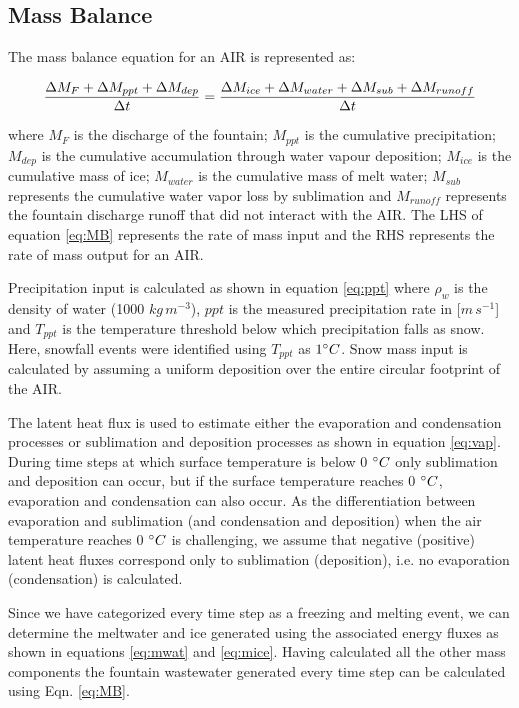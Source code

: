 \documentclass[utf8]{frontiersSCNS} %
\begin{document}
\subsection{Mass Balance}

The mass balance equation for an AIR is represented as:

\begin{equation}
	\frac{\Delta M_{F} + \Delta M_{ppt} + \Delta M_{dep}}{\Delta t} = \frac{\Delta M_{ice} +\Delta M_{water} +
		\Delta M_{sub} + \Delta M_{runoff}}{\Delta t}  \\
	\label{eq:MB}
\end{equation}

where $M_{F}$ is the discharge of the fountain; $M_{ppt}$ is the cumulative precipitation;  $M_{dep}$ is the cumulative
accumulation through water vapour deposition; $M_{ice}$ is the cumulative mass of ice; $M_{water}$ is the cumulative
mass of melt water; $M_{sub}$ represents the cumulative water vapor loss by sublimation and $M_{runoff}$ represents the
fountain discharge runoff that did not interact with the AIR. The LHS of equation \ref{eq:MB} represents the rate of
mass input and the RHS represents the rate of mass output for an AIR.

Precipitation input is calculated as shown in equation \ref{eq:ppt} where $\rho_{w}$ is the density of water (1000
$kg\,m^{-3}$), $ppt$ is the measured precipitation rate in [$m\,s^{-1}$] and $T_{ppt}$ is the temperature threshold
below which precipitation falls as snow. Here, snowfall events were identified using $T_{ppt}$ as $1 \degree C$. Snow
mass input is calculated by assuming a uniform deposition over the entire circular footprint of the AIR.

The latent heat flux is used to estimate either the evaporation and condensation processes or sublimation and deposition
processes as shown in equation \ref{eq:vap}. During time steps at which surface temperature is below 0 $\degree C$ only
sublimation and deposition can occur, but if the surface temperature reaches 0 $\degree C$, evaporation and condensation
can also occur. As the differentiation between evaporation and sublimation (and condensation and deposition) when the
air temperature reaches 0 $\degree C$ is challenging, we assume that negative (positive) latent heat fluxes correspond
only to sublimation (deposition), i.e. no evaporation (condensation) is calculated.

Since we have categorized every time step as a freezing and melting event, we can determine the meltwater and  ice
generated using the associated energy fluxes as shown in equations \ref{eq:mwat} and \ref{eq:mice}. Having calculated
all the other mass components the fountain wastewater generated every time step can be calculated using Eqn.
\ref{eq:MB}.
\end{document}
